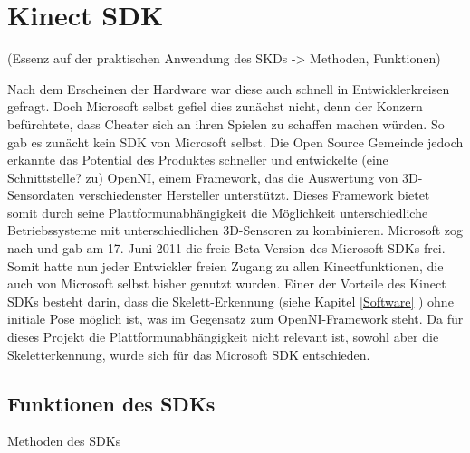 \section{Kinect SDK}
(Essenz auf der praktischen Anwendung des SKDs -> Methoden, Funktionen)

Nach dem Erscheinen der Hardware war diese auch schnell in Entwicklerkreisen gefragt. Doch Microsoft selbst gefiel dies zunächst nicht, denn der Konzern befürchtete, dass Cheater sich an ihren Spielen zu schaffen machen würden.
So gab es zunächt kein SDK von Microsoft selbst. Die Open Source Gemeinde jedoch erkannte das Potential des Produktes schneller und entwickelte (eine Schnittstelle? zu) OpenNI, einem Framework, das die Auswertung von 3D-Sensordaten verschiedenster Hersteller unterstützt. Dieses Framework bietet somit durch seine Plattformunabhängigkeit die Möglichkeit unterschiedliche Betriebssysteme mit unterschiedlichen 3D-Sensoren zu kombinieren.\cite{webb2012beginning}
Microsoft zog nach und gab am 17. Juni 2011 die freie Beta Version des Microsoft SDKs frei. Somit hatte nun jeder Entwickler freien Zugang zu allen Kinectfunktionen, die auch von Microsoft selbst bisher genutzt wurden. Einer der Vorteile des Kinect SDKs besteht darin, dass die Skelett-Erkennung (siehe Kapitel \ref{Software} ) ohne initiale Pose möglich ist, was im Gegensatz zum OpenNI-Framework steht. \cite{webb2012beginning} Da für dieses Projekt die Plattformunabhängigkeit nicht relevant ist, sowohl aber die Skeletterkennung, wurde sich für das Microsoft SDK entschieden.

\subsection{Funktionen des SDKs}
Methoden des SDKs




